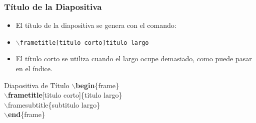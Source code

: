 \documentclass[aspectratio=1610]{beamer}%
\begin{document}
\begin{frame}[fragile]
\frametitle{\textbf{Título de la Diapositiva}}
\justifying
 \begin{itemize}\justifying
  \item El título de la diapositiva se genera con el comando:
  \item []\texttt{$\backslash$frametitle[titulo corto]titulo largo}
  \item El título corto se utiliza cuando el largo ocupe demasiado, como puede pasar en el índice.
\end{itemize}
 \begin{exampleblock}{Diapositiva de Título}
$\backslash$\textbf{begin}\{frame\}\\
$\backslash$\textbf{frametitle}[titulo corto]\{titulo largo\}\\
$\backslash$framesubtitle\{subtitulo largo\}\\
$\backslash$\textbf{end}\{frame\}\\
\end{exampleblock}
\end{frame}

\end{document}
